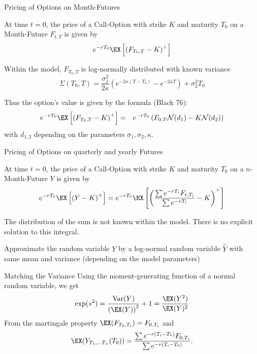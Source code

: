 


{Pricing of Options on Month-Futures}






	At time $t=0$, the price of a  Call-Option with strike $K$ and maturity $T_0$ on a Month-Future $F_{t,T}$ is given by
$$e^{-rT_0}\EX\left[\left(F_{T_0,T}-K\right)^+\right]$$

	Within the model,  $F_{T_0,T}$ is log-normally distributed with known variance
$$
\Sigma(T_0,T) =   \frac{\sigma_1^2}{2\kappa}(e^{-2\kappa (T-T_0)}-e^{-2\kappa T})+\sigma_2^2T_0
$$

	Thus the option's value is given by the formula (Black 76):
\begin{eqnarray*}
e^{-rT_0}\EX\left[\left(F_{T_0,T}-K\right)^+\right] & = &
e^{-rT_0}\left(F_{0,T}\mathcal{N}(d_1)-K\mathcal{N}(d_2)\right)
\end{eqnarray*}with $d_{1,2}$ depending on the parameters $\sigma_1, \sigma_2, \kappa$.






{Pricing of Options on quarterly and yearly Futures}






	At time $t=0$, the price of a  Call-Option with strike $K$ and maturity $T_0$ on a $n$-Month-Future
$Y$ is given by
$$
e^{-rT_0}\EX\left[\left(Y-K\right)^+\right]=e^{-rT_0}\EX
\left[\left(\frac{\sum e^{-rT_i}F_{t,T_i}}{\sum e^{-rT_i}}-K\right)^+\right]$$

	The distribution of the sum is not known within the model. There is no explicit solution to this integral.

	Approximate the random variable $Y$ by a log-normal random variable $\hat{Y}$
with same mean and variance (depending on the model parameters)






{Matching the Variance}
Using the moment-generating function of a normal random variable, we get
$$
\exp (s^2) = \frac{\textrm{Var}(Y)}{\left(\EX (Y)\right)^2} + 1  = \frac{\EX(Y^2)}{\EX(Y)^2}
$$
From the martingale property
$\EX (F_{T_0,T_i}) =  F_{0,T_i} $ and
$$ \EX (Y_{T_1, \ldots T_n}(T_0))  =
\frac{\sum e^{-r(T_i-T_0)} F_{0,T_i}}{\sum e^{-r(T_i-T_0)}}.$$


